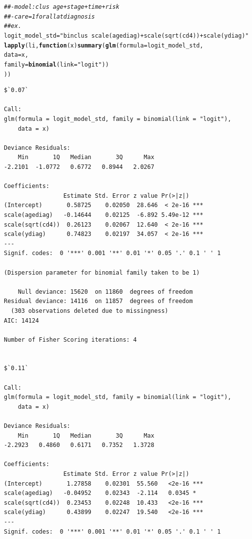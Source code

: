 \documentclass[]{revtex4}\usepackage[]{graphicx}\usepackage[]{color}
\makeatletter
\newcommand{\hlstr}[1]{\textcolor[rgb]{0.192,0.494,0.8}{#1}}%
\newcommand{\hlcom}[1]{\textcolor[rgb]{0.678,0.584,0.686}{\textit{#1}}}%
\newcommand{\hlstd}[1]{\textcolor[rgb]{0.345,0.345,0.345}{#1}}%
\newcommand{\hlkwa}[1]{\textcolor[rgb]{0.161,0.373,0.58}{\textbf{#1}}}%
\newcommand{\hlkwb}[1]{\textcolor[rgb]{0.69,0.353,0.396}{#1}}%
\newcommand{\hlkwc}[1]{\textcolor[rgb]{0.333,0.667,0.333}{#1}}%
\newcommand{\hlkwd}[1]{\textcolor[rgb]{0.737,0.353,0.396}{\textbf{#1}}}%
\newenvironment{kframe}{%
 \def\at@end@of@kframe{}%
 \ifinner\ifhmode%
  \def\at@end@of@kframe{\end{minipage}}%
  \begin{minipage}{\columnwidth}%
 \fi\fi%
 \def\FrameCommand##1{\hskip\@totalleftmargin \hskip-\fboxsep
 \colorbox{shadecolor}{##1}\hskip-\fboxsep
     \hskip-\linewidth \hskip-\@totalleftmargin \hskip\columnwidth}%
 \MakeFramed {\advance\hsize-\width
   \@totalleftmargin\z@ \linewidth\hsize
   \@setminipage}}%
 {\par\unskip\endMakeFramed%
 \at@end@of@kframe}
\newenvironment{knitrout}{}{} %
\makeatother
\begin{document}
\begin{knitrout}
\color{fgcolor}\begin{kframe}
\begin{alltt}
\hlcom{##- model: clus ~ age +  stage + time + risk}
\hlcom{##- care = 1 for all at diagnosis}
\hlcom{## ex. }
\hlstd{logit_model_std} \hlkwb{=} \hlstr{"binclus ~ scale(agediag) + scale(sqrt(cd4)) + scale(ydiag)"}
\hlkwd{lapply}\hlstd{(li,} \hlkwa{function}\hlstd{(}\hlkwc{x}\hlstd{)} \hlkwd{summary}\hlstd{(}\hlkwd{glm}\hlstd{(}\hlkwc{formula} \hlstd{= logit_model_std,}
                                     \hlkwc{data} \hlstd{= x,}
                                     \hlkwc{family} \hlstd{=} \hlkwd{binomial}\hlstd{(}\hlkwc{link} \hlstd{=} \hlstr{"logit"}\hlstd{))}
                               \hlstd{))}
\end{alltt}
\begin{verbatim}
$`0.07`

Call:
glm(formula = logit_model_std, family = binomial(link = "logit"), 
    data = x)

Deviance Residuals: 
    Min       1Q   Median       3Q      Max  
-2.2101  -1.0772   0.6772   0.8944   2.0267  

Coefficients:
                 Estimate Std. Error z value Pr(>|z|)    
(Intercept)       0.58725    0.02050  28.646  < 2e-16 ***
scale(agediag)   -0.14644    0.02125  -6.892 5.49e-12 ***
scale(sqrt(cd4))  0.26123    0.02067  12.640  < 2e-16 ***
scale(ydiag)      0.74823    0.02197  34.057  < 2e-16 ***
---
Signif. codes:  0 '***' 0.001 '**' 0.01 '*' 0.05 '.' 0.1 ' ' 1

(Dispersion parameter for binomial family taken to be 1)

    Null deviance: 15620  on 11860  degrees of freedom
Residual deviance: 14116  on 11857  degrees of freedom
  (303 observations deleted due to missingness)
AIC: 14124

Number of Fisher Scoring iterations: 4


$`0.11`

Call:
glm(formula = logit_model_std, family = binomial(link = "logit"), 
    data = x)

Deviance Residuals: 
    Min       1Q   Median       3Q      Max  
-2.2923   0.4860   0.6171   0.7352   1.3728  

Coefficients:
                 Estimate Std. Error z value Pr(>|z|)    
(Intercept)       1.27858    0.02301  55.560   <2e-16 ***
scale(agediag)   -0.04952    0.02343  -2.114   0.0345 *  
scale(sqrt(cd4))  0.23453    0.02248  10.433   <2e-16 ***
scale(ydiag)      0.43899    0.02247  19.540   <2e-16 ***
---
Signif. codes:  0 '***' 0.001 '**' 0.01 '*' 0.05 '.' 0.1 ' ' 1


\end{verbatim}
\end{kframe}
\end{knitrout}
\end{document}
